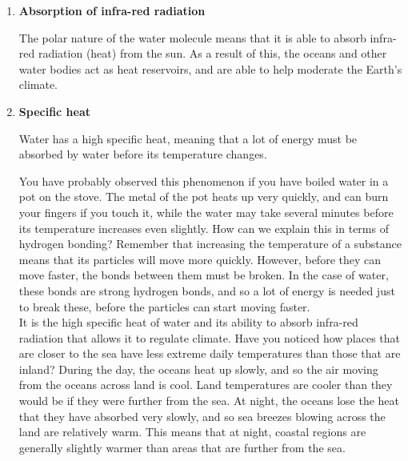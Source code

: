 \begin{enumerate}

\item{\textbf{Absorption of infra-red radiation}

The polar nature of the water molecule means that it is able to absorb infra-red radiation (heat) from the sun. As a result of this, the oceans and other water bodies act as heat reservoirs, and are able to help moderate the Earth's climate.
}

\item{\textbf{Specific heat}


Water has a high specific heat, meaning that a lot of energy must be absorbed by water before its temperature changes. 



You have probably observed this phenomenon if you have boiled water in a pot on the stove. The metal of the pot heats up very quickly, and can burn your fingers if you touch it, while the water may take several minutes before its temperature increases even slightly. How can we explain this in terms of hydrogen bonding? Remember that increasing the temperature of a substance means that its particles will move more quickly. However, before they can move faster, the bonds between them must be broken. In the case of water, these bonds are strong hydrogen bonds, and so a lot of energy is needed just to break these, before the particles can start moving faster.\\

It is the high specific heat of water and its ability to absorb infra-red radiation that allows it to regulate climate. Have you noticed how places that are closer to the sea have less extreme daily temperatures than those that are inland? During the day, the oceans heat up slowly, and so the air moving from the oceans across land is cool. Land temperatures are cooler than they would be if they were further from the sea. At night, the oceans lose the heat that they have absorbed very slowly, and so sea breezes blowing across the land are relatively warm. This means that at night, coastal regions are generally slightly warmer than areas that are further from the sea. \\

}
\end{enumerate}
